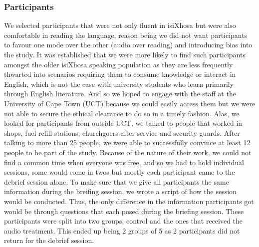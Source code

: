 \subsubsection{Participants}
We selected participants that were not only fluent in isiXhosa but were also comfortable in reading the language, reason being we did not want participants to favour one mode over the other (audio over reading) and introducing bias into the study. It was established that we were more likely to find such participants amongst the older isiXhosa speaking population as they are less frequently thwarted into scenarios requiring them to consume knowledge or interact in English, which is not the case with university students who learn primarily through English literature. And so we hoped to engage with the staff at the University of Cape Town (UCT) because we could easily access them but we were not able to secure the ethical clearance to do so in a timely fashion. Alas, we looked for participants from outside UCT, we talked to people that worked in shops, fuel refill stations, churchgoers after service and security guards. After talking to more than 25 people, we were able to successfully convince at least 12 people to be part of the study. Because of the nature of their work, we could not find a common time when everyone was free, and so we had to hold individual sessions, some would come in twos but mostly each participant came to the debrief session alone. To make sure that we give all participants the same information during the breifing session, we wrote a script of how the session would be conducted. Thus, the only difference in the information participants got would be through questions that each posed during the briefing session. These participants were split into two groups; control and the ones that received the audio treatment. This ended up being 2 groups of 5 as 2 participants did not return for the debrief session.

